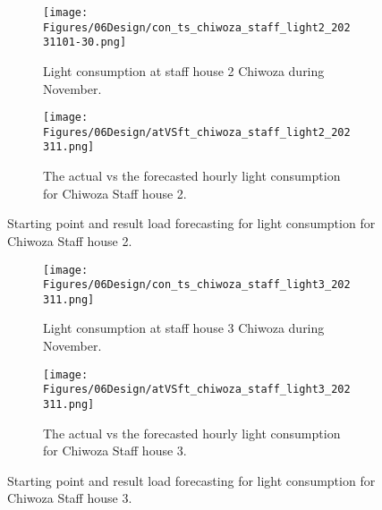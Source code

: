 \begin{figure}
    \begin{subfigure}{\textwidth}
    \centering
    \texttt{[image: Figures/06Design/con\_ts\_chiwoza\_staff\_light2\_20231101-30.png]}
    \caption{Light consumption at staff house 2 Chiwoza during November.}
    \label{fig:con_ts_chiwoza_staff_light2_202311}
  \end{subfigure}

  \vspace{0.5cm}

  \begin{subfigure}{\textwidth}
    \centering
    \texttt{[image: Figures/06Design/atVSft\_chiwoza\_staff\_light2\_202311.png]}
    \caption{The actual vs the forecasted hourly light consumption for Chiwoza Staff house 2.}
    \label{fig:atVSft_chiwoza_staff_light2_202311}
  \end{subfigure}

  \caption[Light consumption staff house 2 forecasting]{Starting point and result load forecasting for light consumption for Chiwoza Staff house 2.}
  \label{fig:forecasting_results_chiwoza_staff_light2}
\end{figure}

\begin{figure}
    \begin{subfigure}{\textwidth}
    \centering
    \texttt{[image: Figures/06Design/con\_ts\_chiwoza\_staff\_light3\_202311.png]}
    \caption{Light consumption at staff house 3 Chiwoza during November.}
    \label{fig:con_ts_chiwoza_staff_light3_20231001-20}
  \end{subfigure}
  
  \vspace{0.5cm}

  
  \begin{subfigure}{\textwidth}
    \centering
    \texttt{[image: Figures/06Design/atVSft\_chiwoza\_staff\_light3\_202311.png]}
    \caption{The actual vs the forecasted hourly light consumption for Chiwoza Staff house 3.}
    \label{fig:atVSft_chiwoza_staff_light3_20231001-20}
  \end{subfigure}


  \caption[Light consumption staff house 3 forecasting]{Starting point and result load forecasting for light consumption for Chiwoza Staff house 3.}
  \label{fig:forecasting_results_chiwoza_staff_light3}
\end{figure}

